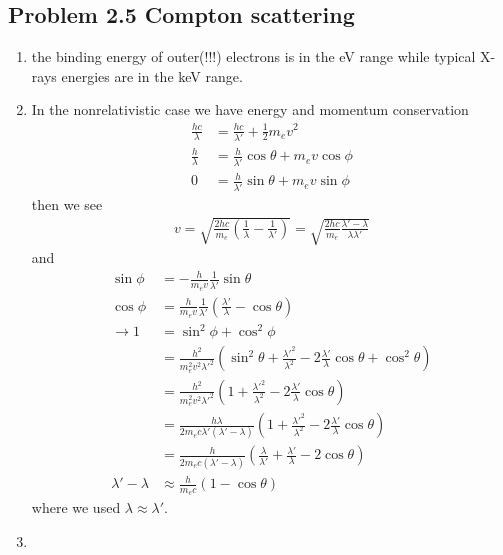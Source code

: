 \documentclass[../main.tex]{subfiles}
\begin{document}
\subsection{Problem 2.5 Compton scattering}
\begin{enumerate}
    \item the binding energy of outer(!!!) electrons is in the eV range while typical X-rays energies are in the keV range.
    \item In the nonrelativistic case we have energy and momentum conservation
    \begin{align}
        \frac{hc}{\lambda}&=\frac{hc}{\lambda'}+\frac{1}{2}m_ev^2\\
        \frac{h}{\lambda}&=\frac{h}{\lambda'}\cos\theta+m_ev\cos\phi\\
        0&=\frac{h}{\lambda'}\sin\theta+m_ev\sin\phi
    \end{align}
    then we see
    \begin{align}
        v=\sqrt{\frac{2hc}{m_e}\left(\frac{1}{\lambda}-\frac{1}{\lambda'}\right)}
        =\sqrt{\frac{2hc}{m_e}\frac{\lambda'-\lambda}{\lambda\lambda'}}
    \end{align}
    and
    \begin{align}
        \sin\phi&=-\frac{h}{m_ev}\frac{1}{\lambda'}\sin\theta\\
        \cos\phi&=\frac{h}{m_ev}\frac{1}{\lambda'}\left(\frac{\lambda'}{\lambda}-\cos\theta\right)\\
        \rightarrow1&=\sin^2\phi+\cos^2\phi\\
        &=\frac{h^2}{m_e^2v^2\lambda'^2}\left(\sin^2\theta+\frac{\lambda'^2}{\lambda^2}-2\frac{\lambda'}{\lambda}\cos\theta+\cos^2\theta\right)\\
        &=\frac{h^2}{m_e^2v^2\lambda'^2}\left(1+\frac{\lambda'^2}{\lambda^2}-2\frac{\lambda'}{\lambda}\cos\theta\right)\\
        &=\frac{h\lambda}{2m_ec\lambda'(\lambda'-\lambda)}\left(1+\frac{\lambda'^2}{\lambda^2}-2\frac{\lambda'}{\lambda}\cos\theta\right)\\
        &=\frac{h}{2m_ec(\lambda'-\lambda)}\left(\frac{\lambda}{\lambda'}+\frac{\lambda'}{\lambda}-2\cos\theta\right)\\
        \lambda'-\lambda&\approx\frac{h}{m_ec}\left(1-\cos\theta\right)
    \end{align}
    where we used $\lambda\approx\lambda'$.
    \item 
\end{enumerate}
    
\end{document}
